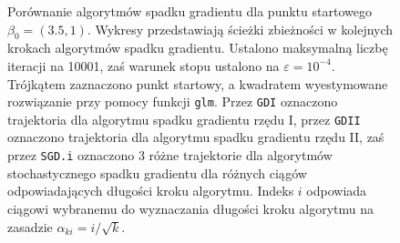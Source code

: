 \begin{figure}[hbt!]
  \caption[Porównanie algorytmów spadku gradientu dla punktu startowego $\beta_0 = (3.5,1)$.]{\label{fig:sc3asd}Porównanie algorytmów spadku gradientu dla punktu startowego $\beta_0 = (3.5,1)$. Wykresy przedstawiają ścieżki zbieżności w kolejnych krokach algorytmów spadku gradientu. Ustalono maksymalną liczbę iteracji na 10001, zaś warunek stopu ustalono na $\varepsilon=10^{-4}$. Trójkątem zaznaczono punkt startowy, a kwadratem wyestymowane rozwiązanie przy pomocy funkcji \texttt{glm}. Przez \texttt{GDI} oznaczono trajektoria dla algorytmu spadku gradientu rzędu I, przez \texttt{GDII} oznaczono trajektoria dla algorytmu spadku gradientu rzędu II, zaś przez \texttt{SGD.i} oznaczono 3 różne trajektorie dla algorytmów stochastycznego spadku gradientu dla różnych ciągów odpowiadających długości kroku algorytmu. Indeks $i$ odpowiada ciągowi wybranemu do wyznaczania długości kroku algorytmu na zasadzie $\alpha_{ki} = i/\sqrt{k}$.}
\end{figure}


